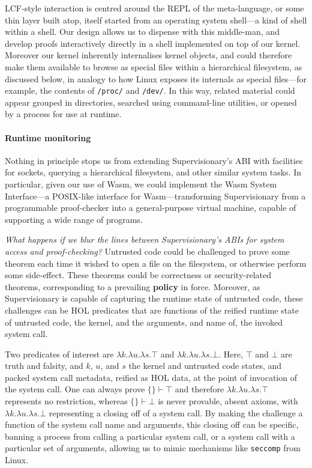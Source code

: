 \documentclass[sigplan, review]{acmart}
\newcommand{\deffont}[1]{\textbf{#1}}
\newcommand{\lam}[1]{\lambda{#1}.}
\begin{document}
LCF-style interaction is centred around the REPL of the meta-language, or some thin layer built atop, itself started from an operating system shell---a kind of shell within a shell.
Our design allows us to dispense with this middle-man, and develop proofs interactively directly in a shell implemented on top of our kernel.
Moreover our kernel inherently internalises kernel objects, and could therefore make them available to browse as special files within a hierarchical filesystem, as discussed below, in analogy to how Linux exposes its internals as special files---for example, the contents of \texttt{/proc/} and \texttt{/dev/}.
In this way, related material could appear grouped in directories, searched using command-line utilities, or opened by a process for use at runtime.

\paragraph{Runtime monitoring}

Nothing in principle stops us from extending Supervisionary's ABI with facilities for sockets, querying a hierarchical filesystem, and other similar system tasks.
In particular, given our use of Wasm, we could implement the Wasm System Interface---a POSIX-like interface for Wasm---transforming Supervisionary from a programmable proof-checker into a general-purpose virtual machine, capable of supporting a wide range of programs.

\emph{What happens if we blur the lines between Supervisionary's ABIs for system access and proof-checking?}
Untrusted code could be challenged to prove some theorem each time it wished to open a file on the filesystem, or otherwise perform some side-effect.
These theorems could be correctness or security-related theorems, corresponding to a prevailing \deffont{policy} in force.
Moreover, as Supervisionary is capable of capturing the runtime state of untrusted code, these challenges can be HOL predicates that are functions of the reified runtime state of untrusted code, the kernel, and the arguments, and name of, the invoked system call.

Two predicates of interest are $\lam{k}\lam{u}\lam{s}\top$ and $\lam{k}\lam{u}\lam{s}\bot$.
Here, $\top$ and $\bot$ are truth and falsity, and $k$, $u$, and $s$ the kernel and untrusted code states, and packed system call metadata, reified as HOL data, at the point of invocation of the system call.
One can always prove $\{\} \vdash \top$ and therefore $\lam{k}\lam{u}\lam{s}\top$ represents no restriction, whereas $\{ \} \vdash \bot$ is never provable, absent axioms, with $\lam{k}\lam{u}\lam{s}\bot$ representing a closing off of a system call.
By making the challenge a function of the system call name and arguments, this closing off can be specific, banning a process from calling a particular system call, or a system call with a particular set of arguments, allowing us to mimic mechanisms like \texttt{seccomp} from Linux.
\end{document}
